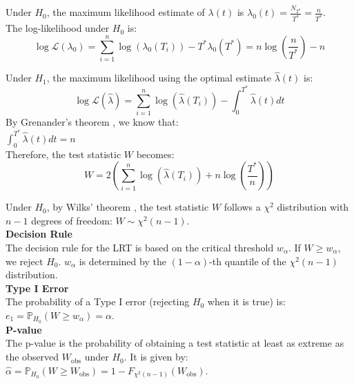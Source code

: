 \documentclass{journalstyle}
\begin{document}
Under $H_0$, the maximum likelihood estimate of $\lambda(t)$ is $\lambda_0(t) = \frac{N_{T^*}}{T^*} = \frac{n}{T^*}$. \\
The log-likelihood under $H_0$ is:
$$
\log\mathcal{L}(\lambda_0) = \sum_{i=1}^n \log(\lambda_0(T_i)) - T^* \lambda_0(T^*) = n \log\left(\frac{n}{T^*}\right) - n
$$

Under $H_1$, the maximum likelihood using the optimal estimate $\hat{\lambda}(t)$ is:
$$
\log\mathcal{L}(\hat{\lambda}) = \sum_{i=1}^n \log(\hat{\lambda}(T_i)) - \int_0^{T^*} \hat{\lambda}(t) dt
$$
By Grenander's theorem \cite{Grenander1956}, we know that: \\
$\int_0^{T^*} \hat{\lambda}(t) dt = n$ \\

Therefore, the test statistic $W$ becomes:
\begin{equation}
    W = 2 \left( \sum_{i=1}^{n} \log(\hat{\lambda}(T_i)) + n \log\left(\frac{T^*}{n}\right) \right)
    \label{eq:boswell_test_statistic}
\end{equation}

Under $H_0$, by Wilks' theorem \cite{Wilks1938}, the test statistic $W$ follows a $\chi^2$ distribution with $n - 1$ degrees of freedom: $W \sim \chi^2(n - 1)$. \\

\noindent\textbf{Decision Rule} \\
The decision rule for the LRT is based on the critical threshold $w_{\alpha}$. 
If $W \geq w_{\alpha}$, we reject $H_0$. $w_{\alpha}$ is determined by the $(1 - \alpha)$-th quantile of the $\chi^2(n - 1)$ distribution. \\

\noindent\textbf{Type I Error} \\
The probability of a Type I error (rejecting $H_0$ when it is true) is: \\
$e_1 = \mathbb{P}_{H_0}(W \geq w_{\alpha}) = \alpha$. \\

\noindent\textbf{P-value} \\
The p-value is the probability of obtaining a test statistic at least as extreme as the observed $W_{\text{obs}}$ under $H_0$. 
It is given by: \\
$\hat{\alpha} = \mathbb{P}_{H_0}(W \geq W_{\text{obs}}) = 1 - F_{\chi^2(n - 1)}(W_{\text{obs}})$. \\
\end{document}

